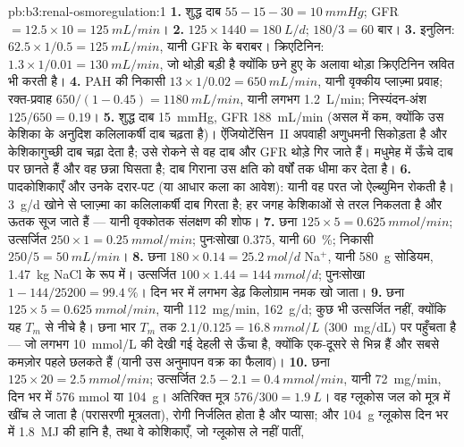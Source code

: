 \begin{solution}{pb:b3:renal-osmoregulation:1}
\textbf{1.} शुद्ध दाब $55 - 15 - 30 = \qty{10}{mmHg}$; GFR $= 12.5
\times 10 = \qty{125}{mL/min}$।
\textbf{2.} $125\times 1440 = \qty{180}{L/d}$; $180/3 = 60$ बार।
\textbf{3.} इनुलिन: $62.5\times 1/0.5 = \qty{125}{mL/min}$, यानी GFR के
बराबर। क्रिएटिनिन: $1.3\times 1/0.01 = \qty{130}{mL/min}$, जो थोड़ी
बड़ी है क्योंकि  छने हुए के अलावा थोड़ा क्रिएटिनिन स्रवित
भी करती है।
\textbf{4.} PAH की निकासी $13\times 1/0.02 = \qty{650}{mL/min}$, यानी
वृक्कीय प्लाज़्मा प्रवाह; रक्त-प्रवाह $650/(1 - 0.45) = \qty{1180}{mL/min}$,
यानी लगभग \qty{1.2}{L/min}; निस्यंदन-अंश $125/650 = 0.19$।
\textbf{5.} शुद्ध दाब \qty{15}{mmHg}, GFR \qty{188}{mL/min} (असल में
कम, क्योंकि उस केशिका के अनुदिश कलिलाकर्षी दाब चढ़ता है)।
ऐंजियोटेंसिन~II अपवाही अणुधमनी सिकोड़ता है और केशिकागुच्छी दाब चढ़ा
देता है; उसे रोकने से वह दाब और GFR थोड़े गिर जाते हैं। मधुमेह में
 ऊँचे दाब पर छानते हैं और वह छन्ना घिसता है; दाब गिराना उस
क्षति को वर्षों तक धीमा कर देता है।
\textbf{6.} पादकोशिकाएँ और उनके दरार-पट (या आधार कला का आवेश): यानी वह
परत जो ऐल्ब्युमिन रोकती है। \qty{3}{g/d} खोने से प्लाज़्मा का
कलिलाकर्षी दाब गिरता है; हर जगह केशिकाओं से तरल निकलता है और ऊतक सूज
जाते हैं --- यानी वृक्कोतक संलक्षण की शोफ।
\textbf{7.} छना $125\times 5 = \qty{0.625}{mmol/min}$; उत्सर्जित
$250\times 1 = \qty{0.25}{mmol/min}$; पुनःसोखा $0.375$, यानी
\qty{60}{\%}; निकासी $250/5 = \qty{50}{mL/min}$।
\textbf{8.} छना $180\times 0.14 = \qty{25.2}{mol/d}$ Na$^{+}$, यानी
\qty{580}{g} सोडियम, \qty{1.47}{kg} NaCl के रूप में। उत्सर्जित
$100\times 1.44
= \qty{144}{mmol/d}$; पुनःसोखा $1 - 144/\num{25200} = \qty{99.4}{\%}$।
दिन भर में लगभग डेढ़ किलोग्राम नमक खो जाता।
\textbf{9.} छना $125\times 5 = \qty{0.625}{mmol/min}$, यानी
\qty{112}{mg/min}, \qty{162}{g/d}; कुछ भी उत्सर्जित नहीं, क्योंकि यह
$T_{m}$ से नीचे है। छना भार $T_{m}$ तक $2.1/0.125 =
\qty{16.8}{mmol/L}$ (\qty{300}{mg/dL}) पर पहुँचता है --- जो लगभग
\qty{10}{mmol/L} की देखी गई देहली से ऊँचा है, क्योंकि 
एक-दूसरे से भिन्न हैं और सबसे कमज़ोर पहले छलकते हैं (यानी उस अनुमापन
वक्र का फैलाव)।
\textbf{10.} छना $125\times 20 = \qty{2.5}{mmol/min}$; उत्सर्जित
$2.5 - 2.1 = \qty{0.4}{mmol/min}$, यानी \qty{72}{mg/min}, दिन भर में
$576$ mmol या \qty{104}{g}। अतिरिक्त मूत्र $576/300 = \qty{1.9}{L}$।
वह ग्लूकोस जल को मूत्र में खींच ले जाता है (परासरणी मूत्रलता), रोगी
निर्जलित होता है और प्यासा; और \qty{104}{g} ग्लूकोस दिन भर में
\qty{1.8}{MJ} की हानि है, तथा वे कोशिकाएँ, जो ग्लूकोस ले नहीं पातीं,

\end{solution}
